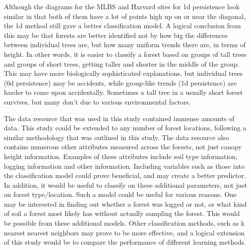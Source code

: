 \documentclass[10pt]{article}
\begin{document}
\indent Although the diagrams for the MLBS and Harvard sites for 1d persistence look similar in that both of them have a lot of points high up on or near the diagonal, the 1d method still gave a better classification model. A logical conclusion from this may be that forests are better identified not by how big the differences between individual trees are, but how many uniform trends there are, in terms of height. In other words, it is easier to classify a forest based on groups of tall trees and groups of short trees, getting taller and shorter in the middle of the group. This may have more biologically sophisticated explanations, but individual trees (0d persistence) may be accidents, while group-like trends (1d persistence) are harder to come upon accidentally. Sometimes a tall tree in a usually short forest survives, but many don't due to various environmental factors.

\indent The data resource that was used in this study contained immense amounts of data. This study could be extended to any number of forest locations, following a similar methodology that was outlined in this study. The data resource also contains numerous other attributes measured across the forests, not just canopy height information. Examples of these attributes include soil type information, logging information and other information. Including variables such as those into the classification model could prove beneficial, and may create a better predictor. In addition, it would be useful to classify on these additional parameters, not just on forest type/location. Such a model could be useful for various reasons. One may be interested in finding out whether a forest was logged or not, or what kind of soil a forest most likely has without actually sampling the forest. This would be possible from these additional models. Other classification methods, such as k nearest nearest neighbors may prove to be more effective, and a logical extension of this study would be to compare the performance of different learning methods.

\medskip

\printbibliography
\end{document}
